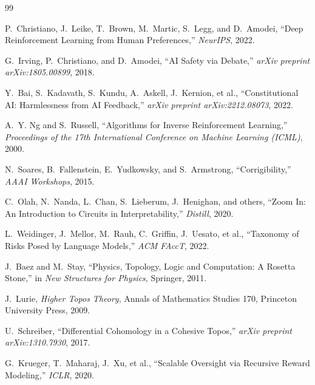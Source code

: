 \documentclass[11pt,a4paper]{article}
\theoremstyle{plain}
\theoremstyle{definition}
\theoremstyle{remark}
\numberwithin{equation}{section}
\begin{document}
\begin{thebibliography}{99}

P.~Christiano, J.~Leike, T.~Brown, M.~Martic, S.~Legg, and D.~Amodei,
``Deep Reinforcement Learning from Human Preferences,''
\emph{NeurIPS}, 2022.

G.~Irving, P.~Christiano, and D.~Amodei,
``AI Safety via Debate,''
\emph{arXiv preprint arXiv:1805.00899}, 2018.

Y.~Bai, S.~Kadavath, S.~Kundu, A.~Askell, J.~Kernion, et al.,
``Constitutional AI: Harmlessness from AI Feedback,''
\emph{arXiv preprint arXiv:2212.08073}, 2022.

A.~Y. Ng and S.~Russell,
``Algorithms for Inverse Reinforcement Learning,''
\emph{Proceedings of the 17th International Conference on Machine Learning (ICML)}, 2000.

N.~Soares, B.~Fallenstein, E.~Yudkowsky, and S.~Armstrong,
``Corrigibility,''
\emph{AAAI Workshops}, 2015.

C.~Olah, N.~Nanda, L.~Chan, S.~Lieberum, J.~Henighan, and others,
``Zoom In: An Introduction to Circuits in Interpretability,''
\emph{Distill}, 2020.

L.~Weidinger, J.~Mellor, M.~Rauh, C.~Griffin, J.~Uesato, et al.,
``Taxonomy of Risks Posed by Language Models,''
\emph{ACM FAccT}, 2022.

J.~Baez and M.~Stay,
``Physics, Topology, Logic and Computation: A Rosetta Stone,''
in \emph{New Structures for Physics}, Springer, 2011.

J.~Lurie,
\emph{Higher Topos Theory}, Annals of Mathematics Studies 170, Princeton University Press, 2009.

U.~Schreiber,
``Differential Cohomology in a Cohesive Topos,''
\emph{arXiv preprint arXiv:1310.7930}, 2017.

G.~Krueger, T.~Maharaj, J.~Xu, et al.,
``Scalable Oversight via Recursive Reward Modeling,''
\emph{ICLR}, 2020.

\end{thebibliography}
\end{document}
